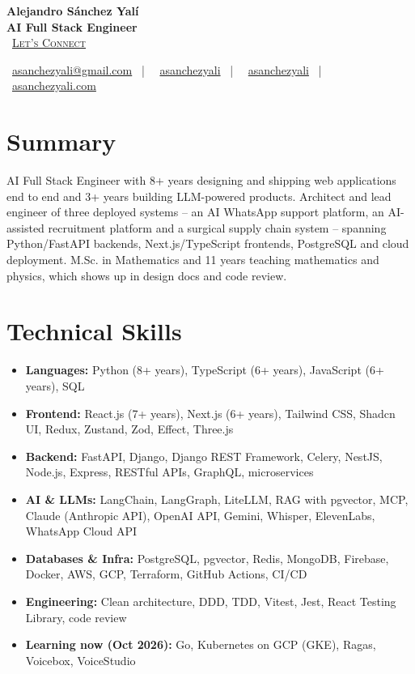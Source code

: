 \documentclass[letterpaper,10pt]{article}
\newcommand{\normalfaCalendar}{{\mdseries\faCalendar}}
\newcommand{\normalfaEnvelope}{{\mdseries\faEnvelope}}
\newcommand{\normalfaLinkedin}{{\mdseries\faLinkedin}}
\newcommand{\normalfaGithub}{{\mdseries\faGithub}}
\newcommand{\normalfaGlobe}{{\mdseries\faGlobe}}
\begin{document}
\begin{center}
\textbf{\LARGE Alejandro S\'anchez Yal\'i}\\[0.2em]
\textbf{\Large AI Full Stack Engineer}\\[0.4em]
\small
\normalfaCalendar\ \href{https://cal.com/asanchezyali/full-time-opportunities}{\textsc{Let's Connect}}

\vspace{0.5em}
\normalfaEnvelope\ \href{mailto:asanchezyali@gmail.com}{asanchezyali@gmail.com}  ~|~
\normalfaLinkedin\ \href{https://www.linkedin.com/in/asanchezyali}{asanchezyali} ~|~
\normalfaGithub\ \href{https://github.com/asanchezyali}{asanchezyali}  ~|~
\normalfaGlobe\ \href{https://asanchezyali.com}{asanchezyali.com}
\end{center}


\section{Summary}
AI Full Stack Engineer with 8+ years designing and shipping web applications end to end and 3+ years building LLM-powered products. Architect and lead engineer of three deployed systems -- an AI WhatsApp support platform, an AI-assisted recruitment platform and a surgical supply chain system -- spanning Python/FastAPI backends, Next.js/TypeScript frontends, PostgreSQL and cloud deployment. M.Sc. in Mathematics and 11 years teaching mathematics and physics, which shows up in design docs and code review.

\section{Technical Skills}
\begin{itemize}[leftmargin=*, itemsep=0pt]
  \item \textbf{Languages:} Python (8+ years), TypeScript (6+ years), JavaScript (6+ years), SQL
  \item \textbf{Frontend:} React.js (7+ years), Next.js (6+ years), Tailwind CSS, Shadcn UI, Redux, Zustand, Zod, Effect, Three.js
  \item \textbf{Backend:} FastAPI, Django, Django REST Framework, Celery, NestJS, Node.js, Express, RESTful APIs, GraphQL, microservices
  \item \textbf{AI \& LLMs:} LangChain, LangGraph, LiteLLM, RAG with pgvector, MCP, Claude (Anthropic API), OpenAI API, Gemini, Whisper, ElevenLabs, WhatsApp Cloud API
  \item \textbf{Databases \& Infra:} PostgreSQL, pgvector, Redis, MongoDB, Firebase, Docker, AWS, GCP, Terraform, GitHub Actions, CI/CD
  \item \textbf{Engineering:} Clean architecture, DDD, TDD, Vitest, Jest, React Testing Library, code review
  \item \textbf{Learning now (Oct 2026):} Go, Kubernetes on GCP (GKE), Ragas, Voicebox, VoiceStudio
\end{itemize}
\end{document}
